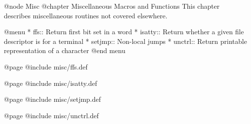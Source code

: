 @node Misc
@chapter Miscellaneous Macros and Functions
This chapter describes miscellaneous routines not covered elsewhere.

@menu 
* ffs::      Return first bit set in a word
* isatty::   Return whether a given file descriptor is for a terminal
* setjmp::   Non-local jumps
* unctrl::   Return printable representation of a character
@end menu

@page
@include misc/ffs.def

@page
@include misc/isatty.def

@page
@include misc/setjmp.def

@page
@include misc/unctrl.def
